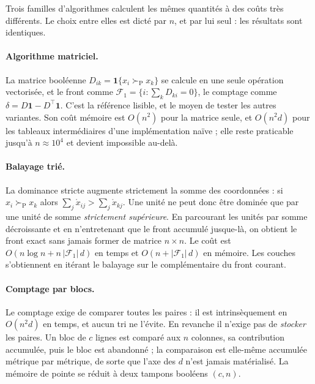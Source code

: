 \documentclass[11pt,a4paper]{article}
\theoremstyle{definition}
\theoremstyle{remark}
\newcommand{\abs}[1]{\left\lvert #1 \right\rvert}
\newcommand{\ind}[1]{\mathbf{1}\{#1\}}
\newcommand{\pareto}{\succ_{\mathrm{P}}}
\begin{document}
Trois familles d'algorithmes calculent les mêmes quantités à des coûts très différents.
Le choix entre elles est dicté par $n$, et par lui seul : les résultats sont identiques.

\medskip

\paragraph{Algorithme matriciel.} La matrice booléenne
$D_{ik} = \ind{x_i \pareto x_k}$ se calcule en une seule opération vectorisée, et le
front comme $\mathcal{F}_1 = \{i : \sum_k D_{ki} = 0\}$, le comptage comme
$\delta = D\mathbf{1} - D^\top\mathbf{1}$. C'est la référence lisible, et le moyen de
tester les autres variantes. Son coût mémoire est $O(n^2)$ pour la matrice seule, et
$O(n^2 d)$ pour les tableaux intermédiaires d'une implémentation naïve ; elle reste
praticable jusqu'à $n \approx 10^4$ et devient impossible au-delà.

\bigskip

\paragraph{Balayage trié.} La dominance stricte augmente strictement la somme des
coordonnées : si $x_i \pareto x_k$ alors $\sum_j \mathring{x}_{ij} >
\sum_j \mathring{x}_{kj}$. Une unité ne peut donc être dominée que par une unité de somme
\emph{strictement supérieure}. En parcourant les unités par somme décroissante et en
n'entretenant que le front accumulé jusque-là, on obtient le front exact sans jamais
former de matrice $n \times n$. Le coût est $O(n \log n + n\,\abs{\mathcal{F}_1}\,d)$ en
temps et $O(n + \abs{\mathcal{F}_1}\,d)$ en mémoire. Les couches s'obtiennent en itérant
le balayage sur le complémentaire du front courant.

\bigskip

\paragraph{Comptage par blocs.} Le comptage exige de comparer toutes les paires : il est
intrinsèquement en $O(n^2 d)$ en temps, et aucun tri ne l'évite. En revanche il n'exige
pas de \emph{stocker} les paires. Un bloc de $c$ lignes est comparé aux $n$ colonnes, sa
contribution accumulée, puis le bloc est abandonné ; la comparaison est elle-même
accumulée métrique par métrique, de sorte que l'axe des $d$ n'est jamais matérialisé. La
mémoire de pointe se réduit à deux tampons booléens $(c, n)$.
\end{document}
